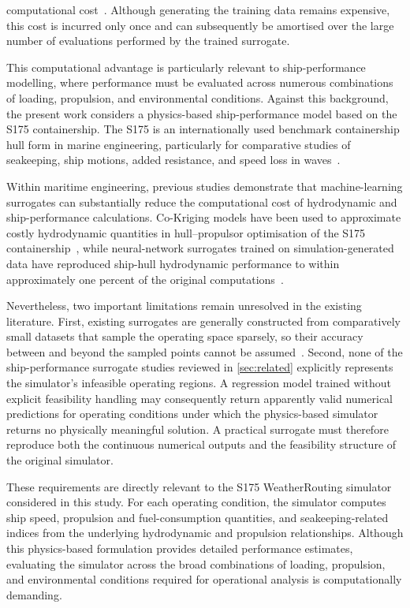 \documentclass[final,5p,times,twocolumn,numbers]{elsarticle}
\begin{document}
computational cost~\cite{cui2025}. Although generating the training data remains expensive, this cost is incurred only once and can subsequently be amortised over the large number of evaluations performed by the trained surrogate.

This computational advantage is particularly relevant to ship-performance modelling, where performance must be evaluated across numerous combinations of loading, propulsion, and environmental conditions. Against this background, the present work considers a physics-based ship-performance model based on the S175 containership. The S175 is an internationally used benchmark containership hull form in marine engineering, particularly for comparative studies of seakeeping, ship motions, added resistance, and speed loss in waves~\cite{kim2017estimation,feng2021parametric,liu2013added}.

Within maritime engineering, previous studies demonstrate that machine-learning surrogates can substantially reduce the computational cost of hydrodynamic and ship-performance calculations. Co-Kriging models have been used to approximate costly hydrodynamic quantities in hull--propulsor optimisation of the S175 containership~\cite{zakerdoost2023}, while neural-network surrogates trained on simulation-generated data have reproduced ship-hull hydrodynamic performance to within approximately one percent of the original computations~\cite{rechevilanova2024}.

Nevertheless, two important limitations remain unresolved in the existing literature. First, existing surrogates are generally constructed from comparatively small datasets that sample the operating space sparsely, so their accuracy between and beyond the sampled points cannot be assumed~\cite{rechevilanova2024}. Second, none of the ship-performance surrogate studies reviewed in \autoref{sec:related} explicitly represents the simulator's infeasible operating regions. A regression model trained without explicit feasibility handling may consequently return apparently valid numerical predictions for operating conditions under which the physics-based simulator returns no physically meaningful solution. A practical surrogate must therefore reproduce both the continuous numerical outputs and the feasibility structure of the original simulator.

These requirements are directly relevant to the S175 WeatherRouting simulator considered in this study. For each operating condition, the simulator computes ship speed, propulsion and fuel-consumption quantities, and seakeeping-related indices from the underlying hydrodynamic and propulsion relationships. Although this physics-based formulation provides detailed performance estimates, evaluating the simulator across the broad combinations of loading, propulsion, and environmental conditions required for operational analysis is computationally demanding.
\end{document}
